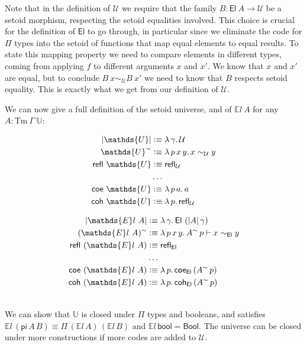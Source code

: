 \documentclass[autoref]{llncs}
\newcommand{\GG}{\Gamma}
\newcommand{\setoidU}{\mathcal{U}}
\newcommand{\Tm}{\mathrm{Tm}}
\newcommand{\El}{\textsf{El}}
\newcommand{\Uty}{\mathds{U}}
\newcommand{\EL}{\mathds{E}l}
\newcommand{\reflu}{\textsf{refl}_\setoidU}
\newcommand{\reflel}{\textsf{refl}_\El}
\newcommand{\equ}[2]{#1 \sim_\setoidU #2}
\newcommand{\eqel}[3]{#1 \vdash #2 \sim_\El #3}
\newcommand{\defeq}{\mathrel{\vcentcolon\equiv}}
\begin{document}
Note that in the definition of $\setoidU$ we require that the family $B : \El\ A
\to \setoidU$ be a setoid morphism, respecting the setoid equalities involved.
%
This choice is crucial for the definition of $\El$ to go through, in particular
since we eliminate the code for $\Pi$ types into the setoid of functions that
map equal elements to equal results. To state this mapping property we need to
compare elements in different types, coming from applying $f$ to different
arguments $x$ and $x'$. We know that $x$ and $x'$ are equal, but to conclude
$\equ{B\ x}{B\ x'}$ we need to know that $B$ respects setoid equality. This is
exactly what we get from our definition of $\setoidU$.

We can now give a full definition of the setoid universe, and of $\EL\ A$ for
any $A : \Tm\ \GG\ \Uty$: \\
\vspace{-0.2em}
\begin{minipage}{0.5\textwidth}
\begin{align*}
  | \Uty | &\defeq \lambda\, \gamma . \, \setoidU \\
  \Uty^\sim &\defeq \lambda \,p\, x\, y . \,x \sim_{\setoidU} y \\
  \textsf{refl}\ \Uty &\defeq \reflu \\
  &\ldots \\
  \textsf{coe}\ \Uty &\defeq \lambda\,p\,a . \, a \\
  \textsf{coh}\ \Uty &\defeq \lambda\,p . \, \reflu
\end{align*}
\end{minipage}
\begin{minipage}{0.5\textwidth}
\begin{align*}
  | \EL\ A | &\defeq \lambda \, \gamma . \, \El\ (| A | \,\gamma) \\
  (\EL\ A)^\sim &\defeq \lambda \, p \, x \, y . \, \eqel{A^\sim\,p}{x}{y} \\
  \textsf{refl}\ (\EL\ A) &\defeq \reflel \\
  &\ldots \\
  \textsf{coe}\ (\EL\ A) &\defeq \lambda\,p.\, \textsf{coe}_{\El}\,(A^\sim\,p) \\
  \textsf{coh}\ (\EL\ A) &\defeq \lambda\,p.\, \textsf{coh}_{\El}\,(A^\sim\,p)
\end{align*}
\end{minipage}
\\

We can show that $\Uty$ is closed under $\Pi$ types and booleans, and satisfies
$\EL\,(\mathsf{pi}\,A\,B) \equiv \Pi\,(\EL\,A)\,(\EL\,B)$ and
$\EL\,\mathsf{bool} = \mathsf{Bool}$. The universe can be closed under more
constructions if more codes are added to $\setoidU$.
\end{document}
